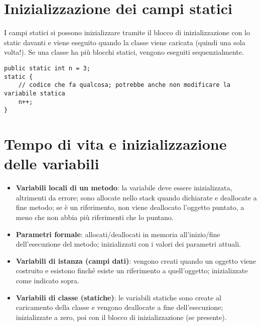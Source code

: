 \section{Inizializzazione dei campi statici}
I campi statici si possono inizializzare tramite il blocco di inizializzazione con lo static davanti e viene eseguito quando la classe viene caricata (quindi una sola volta!). Se una classe ha più blocchi statici, vengono eseguiti sequenzialmente.

\begin{lstlisting}
public static int n = 3;
static {
	// codice che fa qualcosa; potrebbe anche non modificare la variabile statica
	n++;
}
\end{lstlisting}

\section{Tempo di vita e inizializzazione delle variabili}
\begin{itemize}
\item \textbf{Variabili locali di un metodo}: la variabile deve essere inizializzata, altrimenti da errore; sono allocate nello stack quando dichiarate e deallocate a fine metodo; se è un riferimento, non viene deallocato l'oggetto puntato, a meno che non abbia più riferimenti che lo puntano. 
\item \textbf{Parametri formale}: allocati/deallocati in memoria all'inizio/fine dell'esecuzione del metodo; inizializzati con i valori dei parametri attuali.
\item \textbf{Variabili di istanza (campi dati)}: vengono creati quando un oggetto viene costruito e esistono finché esiste un riferimento a quell'oggetto; inizializzate come indicato sopra. 
\item \textbf{Variabili di classe (statiche)}: le variabili statiche sono create al caricamento della classe e vengono deallocate a fine dell'esecuzione; inizializzate a zero, poi con il blocco di inizializzazione (se presente).
\end{itemize}
